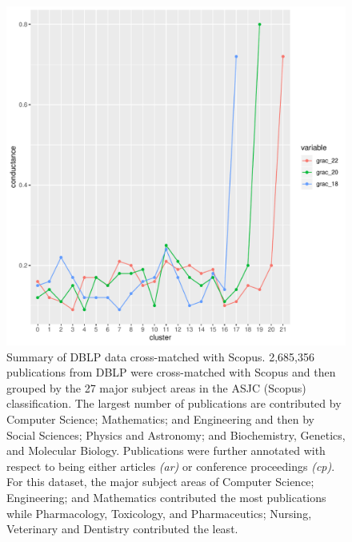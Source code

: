  \begin{figure}[ht]
\centering
  \includegraphics[scale=0.5]{graclus_comparison.pdf}
\caption{Summary of DBLP data cross-matched with Scopus. 2,685,356 publications from DBLP were cross-matched with Scopus and then grouped by the 27 major subject areas in the ASJC (Scopus) classification. The largest number of publications are contributed by Computer Science; Mathematics; and Engineering and then by Social Sciences; Physics and Astronomy; and Biochemistry, Genetics, and Molecular Biology. Publications were further annotated with respect to being either articles \emph{(ar)} or conference proceedings \emph{(cp)}. For this dataset, the major subject areas of Computer Science; Engineering; and Mathematics contributed the most publications while Pharmacology, Toxicology, and Pharmaceutics; Nursing, Veterinary and Dentistry contributed the least.}
\label{fig:graclus_comparison}       %
\end{figure}



